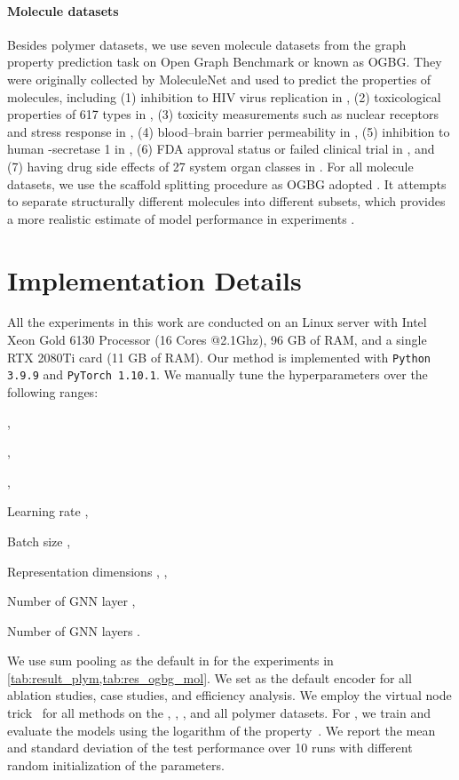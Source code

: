 \documentclass[sigconf]{acmart}
\begin{document}
\vspace{-0.05in}
\paragraph{Molecule datasets} Besides polymer datasets, we use seven molecule datasets from the graph property prediction task on Open Graph Benchmark or known as OGBG. They were originally collected by MoleculeNet \cite{wu2018moleculenet} and used to predict the properties of molecules, including (1) inhibition to HIV virus replication in \hiv, (2) toxicological properties of 617 types in \toxcast, (3) toxicity measurements such as nuclear receptors and stress response in \toxt, (4) blood–brain barrier permeability in \bbbp, (5) inhibition to human -secretase 1 in \bace, (6) FDA approval status or failed clinical trial in \clintox, and (7) having drug side effects of 27 system organ classes in \sider. For all molecule datasets, we use the scaffold splitting procedure as OGBG adopted \cite{hu2020open}. It attempts to separate structurally different molecules into different subsets, which provides a more realistic estimate of model performance in experiments \cite{wu2018moleculenet}.

\section{Implementation Details}
\label{sec:details}

All the experiments in this work are conducted on an Linux server with Intel Xeon Gold 6130 Processor (16 Cores @2.1Ghz), 96 GB of RAM, and a single RTX 2080Ti card (11 GB of RAM). Our method is implemented with \verb+Python 3.9.9+ and \verb+PyTorch 1.10.1+. We manually tune the hyperparameters over the following ranges:
\begin{compactitem}
\item ,
\item ,
\item ,
\item Learning rate ,
\item Batch size ,
\item Representation dimensions , ,
\item Number of GNN layer ,
\item Number of GNN layers .
\end{compactitem}
We use sum pooling as the default  in \method for the experiments in \cref{tab:result_plym,tab:res_ogbg_mol}. We set \gin as the default encoder for all ablation studies, case studies, and efficiency analysis.
We employ the virtual node trick~\cite{hu2020open} for all methods on the \hiv, \toxt, \bbbp, and all polymer datasets. For \density, we train and evaluate the models using the logarithm of the property~\cite{ma2020pi1m}.
We report the mean and standard deviation of the test performance over 10 runs with different random initialization of the parameters. 
\end{document}
